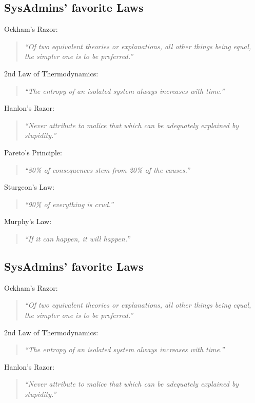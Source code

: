 \documentclass[xga]{xdvislides}
\newcommand{\smallish}{\fontsize{18}{18}\selectfont}
\begin{document}
\subsection{SysAdmins' favorite Laws}
\smallish
Ockham's Razor:
\begin{quote}
{\em ``Of two equivalent theories or explanations, all other things being
equal, the simpler one is to be preferred.''}
\end{quote}

2nd Law of Thermodynamics:
\begin{quote}
{\em ``The entropy of an isolated system always increases with time.''}
\end{quote}

Hanlon's Razor:
\begin{quote}
{\em ``Never attribute to malice that which can be adequately explained by
stupidity.''}
\end{quote}

Pareto's Principle:
\begin{quote}
{\em ``80\% of consequences stem from 20\% of the causes.''}
\end{quote}

Sturgeon's Law:
\begin{quote}
{\em ``90\% of everything is crud.''}
\end{quote}

Murphy's Law:
\begin{quote}
{\em ``If it can happen, it will happen.''}
\end{quote}
\Normalsize


\subsection{SysAdmins' favorite Laws}
\smallish
Ockham's Razor:
\begin{quote}
{\em ``Of two equivalent theories or explanations, all other things being
equal, the simpler one is to be preferred.''}
\end{quote}

2nd Law of Thermodynamics:
\begin{quote}
{\em ``The entropy of an isolated system always increases with time.''}
\end{quote}

Hanlon's Razor:
\begin{quote}
{\em ``Never attribute to malice that which can be adequately explained by
stupidity.''}
\end{quote}
\end{document}
